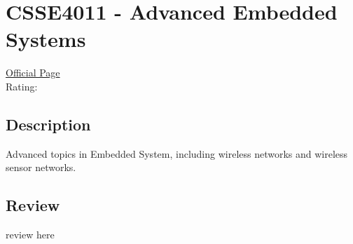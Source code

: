\hypertarget{CSSE4011}{\section{CSSE4011 - Advanced Embedded Systems}}

\large
\textcolor{turbo_purple}{\href{https://my.uq.edu.au/programs-courses/course.html?course_code=CSSE4011}{Official Page}} \\
Rating: \cstar\cstar\cstar\cstar\ostar

\normalsize
\subsection*{Description}
Advanced topics in Embedded System, including wireless networks and wireless sensor networks.

\subsection*{Review}
review here
